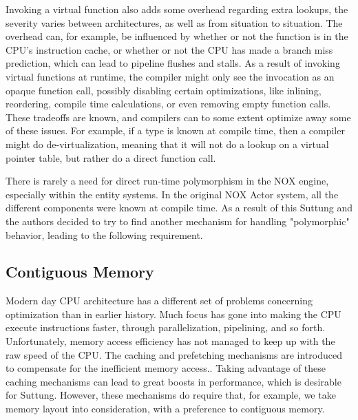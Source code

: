 Invoking a virtual function also adds some overhead regarding extra lookups, the severity varies between architectures,
as well as from situation to situation.
The overhead can, for example, be influenced by whether or not the function is in the CPU's instruction cache, or whether or not the CPU has made a branch miss prediction, which can lead to pipeline flushes and stalls\cite{scott_meyers_cpu_caches_and_why_you_care}\cite[Data Locality]{game_programming_patterns}.
As a result of invoking virtual functions at runtime, the compiler might only see the invocation as an opaque function call,
possibly disabling certain optimizations, like inlining, reordering, compile time calculations, or even removing empty function calls. 
These tradeoffs are known, and compilers can to some extent optimize away some of these issues.
For example, if a type is known at compile time, then a compiler might do de-virtualization,
meaning that it will not do a lookup on a virtual pointer table, but rather do a direct function call\cite{lazarenko_devirtualization}.

There is rarely a need for direct run-time polymorphism in the NOX engine, especially within the entity systems.
In the original NOX Actor system, all the different components were known at compile time.
As a result of this Suttung and the authors decided to try to find another mechanism for handling "polymorphic" behavior, leading to the following requirement.


\subsection{Contiguous Memory}
\label{subsec:requirements_performance_contiguous_memory}
Modern day CPU architecture has a different set of problems concerning optimization than in earlier history.
Much focus has gone into making the CPU execute instructions faster, through parallelization, pipelining, and so forth.
Unfortunately, memory access efficiency has not managed to keep up with the raw speed of the CPU.
The caching and prefetching mechanisms are introduced to compensate for the inefficient memory access.\cite[p. 153]{game_engine_architecture}.
Taking advantage of these caching mechanisms can lead to great boosts in performance, which is desirable for Suttung.
However, these mechanisms do require that, for example, we take memory layout into consideration, with a preference
to contiguous memory.

